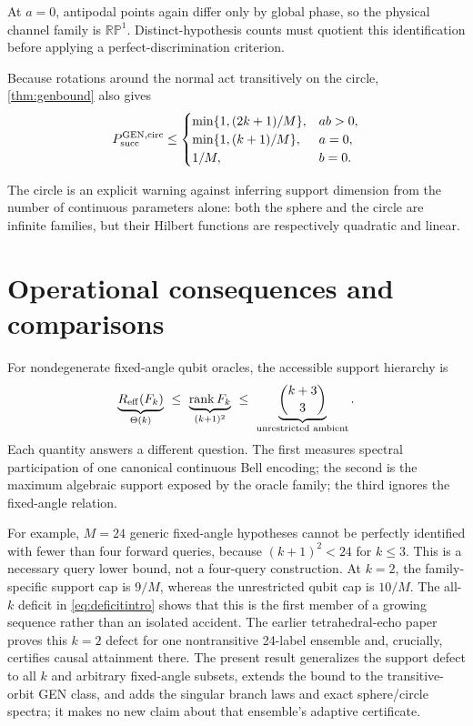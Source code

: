 \documentclass[11pt]{article}
\theoremstyle{definition}
\theoremstyle{remark}
\newcommand{\rank}{\operatorname{rank}}
\begin{document}
At $a=0$, antipodal points again differ only by global phase, so the physical
channel family is $\mathbb{RP}^1$.  Distinct-hypothesis counts must quotient
this identification before applying a perfect-discrimination criterion.

Because rotations around the normal act transitively on the circle,
\cref{thm:genbound} also gives
\begin{equation}
 P_{\rm succ}^{\rm GEN,circ}\leq
 \begin{cases}
 \min\{1,(2k+1)/M\},&ab>0,\\
 \min\{1,(k+1)/M\},&a=0,\\
 1/M,&b=0.
 \end{cases}
\end{equation}

The circle is an explicit warning against inferring support dimension from
the number of continuous parameters alone: both the sphere and the circle
are infinite families, but their Hilbert functions are respectively
quadratic and linear.

\section{Operational consequences and comparisons}

For nondegenerate fixed-angle qubit oracles, the accessible support hierarchy
is
\begin{equation}
 \underbrace{R_{\rm eff}(F_k)}_{\Theta(k)}
 \ \leq\ 
 \underbrace{\rank F_k}_{(k+1)^2}
 \ \leq\ 
 \underbrace{\binom{k+3}{3}}_{\text{unrestricted ambient}}.
\end{equation}
Each quantity answers a different question.  The first measures spectral
participation of one canonical continuous Bell encoding; the second is the
maximum algebraic support exposed by the oracle family; the third ignores the
fixed-angle relation.

For example, $M=24$ generic fixed-angle hypotheses cannot be perfectly
identified with fewer than four forward queries, because
$(k+1)^2<24$ for $k\leq3$.  This is a necessary query lower bound, not a
four-query construction.  At $k=2$, the family-specific support cap is
$9/M$, whereas the unrestricted qubit cap is $10/M$.  The all-$k$ deficit in
\cref{eq:deficitintro} shows that this is the first member of a growing
sequence rather than an isolated accident.  The earlier tetrahedral-echo
paper~\cite{eriksson2026echo} proves this $k=2$ defect for one nontransitive
24-label ensemble and, crucially, certifies causal attainment there.  The
present result generalizes the support defect to all $k$ and arbitrary
fixed-angle subsets, extends the bound to the transitive-orbit GEN class, and
adds the singular branch laws and exact sphere/circle spectra; it makes no
new claim about that ensemble's adaptive certificate.
\end{document}
